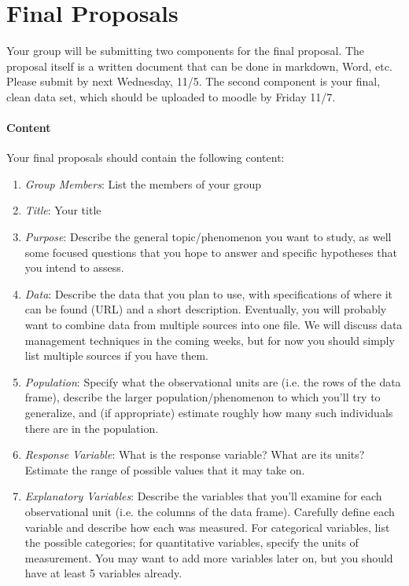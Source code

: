 \documentclass[10pt]{article}
\begin{document}

\section*{Final Proposals}

Your group will be submitting two components for the final proposal.  The proposal
itself is a written document that can be done in markdown, Word, etc.  Please submit
by next Wednesday, 11/5.  The second component is your final, clean data set, which 
should be uploaded to moodle by Friday 11/7.

\paragraph{Content}

Your final proposals should contain the following content:

\begin{enumerate}
	\item \emph{Group Members}: List the members of your group
	\item \emph{Title}: Your title
	\item \emph{Purpose}: Describe the general topic/phenomenon you want to study, as well some focused questions that you hope to answer and specific hypotheses that you intend to assess.
	\item \emph{Data}: Describe the data that you plan to use, with specifications of where it can be found (URL) and a short description. Eventually, you will probably want to combine data from multiple sources into one file. We will discuss data management techniques in the coming weeks, but for now you should simply list multiple sources if you have them. 
	\item \emph{Population}: Specify what the observational units are (i.e. the rows of the data frame), describe the larger population/phenomenon to which you'll try to generalize, and (if appropriate) estimate roughly how many such individuals there are in the population.
	\item \emph{Response Variable}: What is the response variable? What are its units? Estimate the range of possible values that it may take on. 
	\item \emph{Explanatory Variables}: Describe the variables that you'll examine for each observational unit (i.e. the columns of the data frame). Carefully define each variable and describe how each was measured. For categorical variables, list the possible categories; for quantitative variables, specify the units of measurement. You may want to add more variables later on, but you should have at least 5 variables already. 
\end{enumerate}
\end{document}
